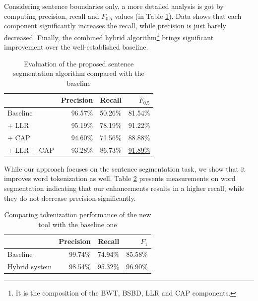 Considering sentence boundaries only, a more detailed analysis is got by computing precision, recall and $F_{0.5}$ values (in Table \ref{tab:prec_rec}). 
Data shows that each component significantly increases the recall, while precision is just barely decreased. 
Finally, the combined hybrid algorithm\footnote{It is the composition of the BWT, BSBD, LLR and CAP components.} brings significant improvement over the well-established baseline.

\begin{table}[H]
\centering
\caption{Evaluation of the proposed sentence segmentation algorithm compared with the baseline}
\label{tab:prec_rec}
\begin{tabular}{ l r r  r  } 
\hline
& Precision & Recall & $F_{0.5}$ \\
\hline
Baseline & 96.57\% & 50.26\% & 81.54\%  \\
+ LLR & 95.19\% & 78.19\% & 91.22\% \\
+ CAP & 94.60\% & 71.56\% & 88.88\% \\
+ LLR + CAP & 93.28\% & 86.73\% & \underline{91.89\%} \\
\hline
\end{tabular}
\end{table}


While our approach focuses on the sentence segmentation task, we show that it improves word tokenization as well. 
Table \ref{tab:tok_eval} presents measurements on word segmentation indicating that our enhancements results in a higher recall, while they do not decrease precision significantly. \label{sec:eval}


\begin{table}[h]
\centering
\caption{Comparing tokenization performance of the new tool with the baseline one}
\label{tab:tok_eval}
\begin{tabular}{ l r r r} 
\hline
& Precision & Recall & $F_{1}$ \\
\hline
Baseline & 99.74\% & 74.94\% & 85.58\%  \\
Hybrid system & 98.54\% & 95.32\% & \underline{96.90\%} \\
\hline
\end{tabular}
\end{table}


